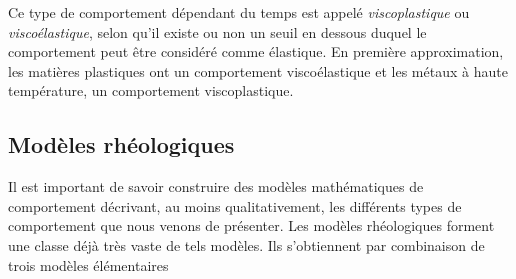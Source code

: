 Ce type de comportement dépendant du temps est appelé \emph{viscoplastique} ou \emph{viscoélastique}, selon qu'il existe ou non un seuil en dessous duquel le comportement peut être considéré comme élastique.
En première approximation, les matières plastiques ont un comportement viscoélastique et les métaux à haute température, un comportement viscoplastique.

\subsection{Modèles rhéologiques} \label{ssec:Ch04-2.2}
Il est important de savoir construire des modèles mathématiques de comportement décrivant, au moins qualitativement, les différents types de comportement que nous venons de présenter.
Les modèles rhéologiques forment une classe déjà très vaste de tels modèles.
Ils s'obtiennent par combinaison de trois modèles élémentaires
